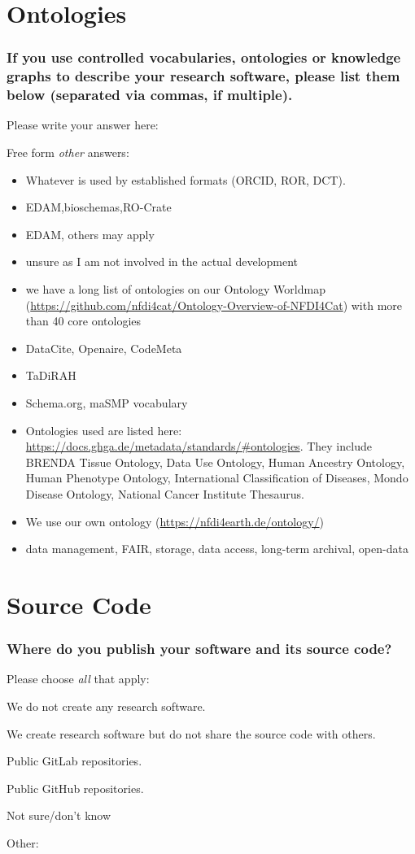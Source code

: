 \documentclass[headsepline,titlepage,twoside,12pt,toc=flat,headings=normal]{scrreprt}
\newcommand{\question}[1]{\subsubsection{#1}}
\newcommand{\otherbox}{\fbox{\phantom{This is how big an answer would be.}}}
\begin{document}
\section{Ontologies}
\question{If you use controlled vocabularies, ontologies or knowledge graphs to describe your research software, please list them below (separated via commas, if multiple).}
Please write your answer here: \otherbox

Free form \emph{other} answers:
\begin{itemize}
\item Whatever is used by established formats (ORCID, ROR, DCT).
\item EDAM,bioschemas,RO-Crate
\item EDAM, others may apply
\item unsure as I am not involved in the actual development
\item we have a long list of ontologies on our Ontology Worldmap (\url{https://github.com/nfdi4cat/Ontology-Overview-of-NFDI4Cat}) with more than 40 core ontologies
\item DataCite, Openaire, CodeMeta
\item TaDiRAH
\item Schema.org, maSMP vocabulary
\item Ontologies used are listed here: \url{https://docs.ghga.de/metadata/standards/#ontologies}. They include BRENDA Tissue Ontology, Data Use Ontology, Human Ancestry Ontology, Human Phenotype Ontology, International Classification of Diseases, Mondo Disease Ontology, National Cancer Institute Thesaurus.
\item We use our own ontology (\url{https://nfdi4earth.de/ontology/})
\item data management, FAIR, storage, data access, long-term archival, open-data
\end{itemize}

\section{Source Code}
\question{Where do you publish your software and its source code?}
Please choose \emph{all} that apply:

\begin{answers}
\item We do not create any research software.
\item We create research software but do not share the source code with others.
\item Public GitLab repositories.
\item Public GitHub repositories.
\item Not sure/don't know
\item Other: \otherbox
\end{answers}
\end{document}
